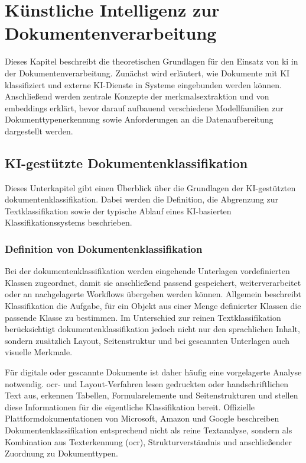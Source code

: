 \section{Künstliche Intelligenz zur Dokumentenverarbeitung}\label{chapter:kuenstliche_intelligenz_zur_dokumentenverarbeitung}

Dieses Kapitel beschreibt die theoretischen Grundlagen für den Einsatz von \gls{ki} in der Dokumentenverarbeitung. Zunächst wird erläutert, wie Dokumente mit KI klassifiziert und externe KI-Dienste in Systeme eingebunden werden können. Anschließend werden zentrale Konzepte der \gls{merkmalsextraktion} und von \gls{embedding}s erklärt, bevor darauf aufbauend verschiedene Modellfamilien zur Dokumenttypenerkennung sowie Anforderungen an die Datenaufbereitung dargestellt werden.

\subsection{KI-gestützte Dokumentenklassifikation}

Dieses Unterkapitel gibt einen Überblick über die Grundlagen der KI-gestützten \gls{dokumentenklassifikation}. Dabei werden die Definition, die Abgrenzung zur Textklassifikation sowie der typische Ablauf eines KI-basierten Klassifikationssystems beschrieben.

\subsubsection{Definition von Dokumentenklassifikation}

Bei der \gls{dokumentenklassifikation} werden eingehende Unterlagen vordefinierten Klassen zugeordnet, damit sie anschließend passend gespeichert, weiterverarbeitet oder an nachgelagerte Workflows übergeben werden können. Allgemein beschreibt Klassifikation die Aufgabe, für ein Objekt aus einer Menge definierter Klassen die passende Klasse zu bestimmen. Im Unterschied zur reinen Textklassifikation berücksichtigt \gls{dokumentenklassifikation} jedoch nicht nur den sprachlichen Inhalt, sondern zusätzlich Layout, Seitenstruktur und bei gescannten Unterlagen auch visuelle Merkmale. \cite{manning2008irbook,aws_comprehend_training_classification_models,azure_document_intelligence_custom_classifier,vrdcu_survey_2024}

Für digitale oder gescannte Dokumente ist daher häufig eine vorgelagerte Analyse notwendig. \acrshort{ocr}- und Layout-Verfahren lesen gedruckten oder handschriftlichen Text aus, erkennen Tabellen, Formularelemente und Seitenstrukturen und stellen diese Informationen für die eigentliche Klassifikation bereit. Offizielle Plattformdokumentationen von Microsoft, Amazon und Google beschreiben Dokumentenklassifikation entsprechend nicht als reine Textanalyse, sondern als Kombination aus Texterkennung (\acrshort{ocr}), Strukturverständnis und anschließender Zuordnung zu Dokumenttypen. \cite{azure_document_intelligence_overview,aws_comprehend_document_processing,aws_textract_whatis,googlecloud_documentai_custom_classifier}\\

